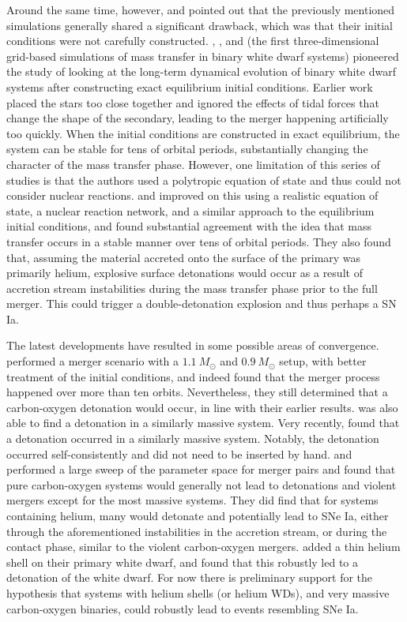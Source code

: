 \documentclass[iop]{emulateapj}
\begin{document}
Around the same time, however, \cite{guillochon:2010} and
\cite{dan:2011} pointed out that the previously mentioned simulations 
generally shared a significant drawback, which was that their initial conditions
were not carefully constructed. \cite{motl:2002}, \cite{dsouza:2006},
and \cite{motl:2007} (the first three-dimensional grid-based
simulations of mass transfer in binary white dwarf systems) pioneered
the study of looking at the long-term dynamical evolution of binary
white dwarf systems after constructing exact equilibrium initial
conditions. Earlier work placed the stars too close together 
and ignored the effects of tidal forces that change the shape of the 
secondary, leading to the merger
happening artificially too quickly. When the initial conditions are
constructed in exact equilibrium, the system can be stable for tens of
orbital periods, substantially changing the character of the mass
transfer phase. However, one limitation of this series of studies is
that the authors used a polytropic equation of state and thus could
not consider nuclear reactions. \cite{guillochon:2010} and
\cite{dan:2011} improved on this using a realistic equation of state,
a nuclear reaction network, and a similar approach to the equilibrium
initial conditions, and found substantial agreement with the idea that
mass transfer occurs in a stable manner over tens of orbital
periods. They also found that, assuming the material accreted onto the
surface of the primary was primarily helium, explosive surface
detonations would occur as a result of accretion stream instabilities
during the mass transfer phase prior to the full merger. This could
trigger a double-detonation explosion and thus perhaps a SN Ia.

The latest developments have resulted in some possible areas of convergence.
\cite{pakmor:2012} performed a merger scenario
with a $1.1\ M_\odot$ and $0.9\ M_\odot$ setup, with better treatment
of the initial conditions, and indeed found that the merger process
happened over more than ten orbits. Nevertheless, they still determined
that a carbon-oxygen detonation would occur, in line with their
earlier results. \cite{moll:2014} was also able to find a detonation
in a similarly massive system. Very recently, \cite{kashyap:2015} 
found that a detonation occurred in a similarly massive system. Notably,
the detonation occurred self-consistently and did not need to be inserted 
by hand. \cite{dan:2012} and \cite{dan:2014} performed a large sweep 
of the parameter space for merger pairs and
found that pure carbon-oxygen systems would generally not lead to
detonations and violent mergers except for the most massive
systems. They did find that for systems containing helium, many
would detonate and potentially lead to SNe Ia, either through the
aforementioned instabilities in the accretion stream, or during the
contact phase, similar to the violent carbon-oxygen
mergers. \cite{pakmor:2013} added a thin helium shell on their primary
white dwarf, and found that this robustly led to a detonation of the
white dwarf. For now there is preliminary support for the hypothesis
that systems with helium shells (or helium WDs), and very massive carbon-oxygen binaries,
could robustly lead to events resembling SNe Ia.
\end{document}
